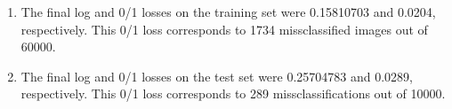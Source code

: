 \documentclass{article}
\begin{document}
\begin{enumerate}
\begin{figure}
        \caption{The 0/1 loss of Stochastic gradient descent for the softmax classification problem applied to random neural net features of the projected MNIST dataset as a function of iteration, starting at iteration 0}
        \label{fig:z1LossNNFeats18Epochs}
    \end{figure}
    Figure \ref{fig:z1LossNNFeats18Epochs} is a visualization of the 0/1 loss for this problem, starting after an epoch has passed. Plotted are the 0/1 losses for the training and test data, with both the true weights and the epoch-averages.
    \item The final log and 0/1 losses on the training set were 0.15810703 and 0.0204, respectively. This 0/1 loss corresponds to 1734 missclassified images out of 60000.
    \item The final log and 0/1 losses on the test set were 0.25704783 and 0.0289, respectively. This 0/1 loss corresponds to 289 missclassifications out of 10000.
\end{enumerate}


\end{document}
